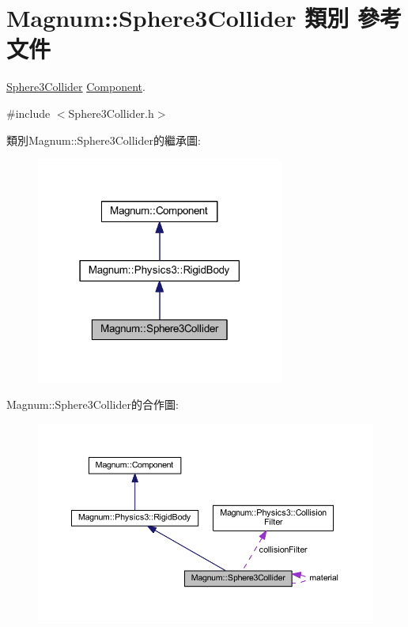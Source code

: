 \hypertarget{class_magnum_1_1_sphere3_collider}{}\section{Magnum\+:\+:Sphere3\+Collider 類別 參考文件}
\label{class_magnum_1_1_sphere3_collider}


\hyperlink{class_magnum_1_1_sphere3_collider}{Sphere3\+Collider} \hyperlink{class_magnum_1_1_component}{Component}.  




{\ttfamily \#include $<$Sphere3\+Collider.\+h$>$}



類別\+Magnum\+:\+:Sphere3\+Collider的繼承圖\+:\nopagebreak
\begin{figure}[H]
\begin{center}
\leavevmode
\includegraphics[width=231pt]{class_magnum_1_1_sphere3_collider__inherit__graph}
\end{center}
\end{figure}


Magnum\+:\+:Sphere3\+Collider的合作圖\+:\nopagebreak
\begin{figure}[H]
\begin{center}
\leavevmode
\includegraphics[width=350pt]{class_magnum_1_1_sphere3_collider__coll__graph}
\end{center}
\end{figure}
